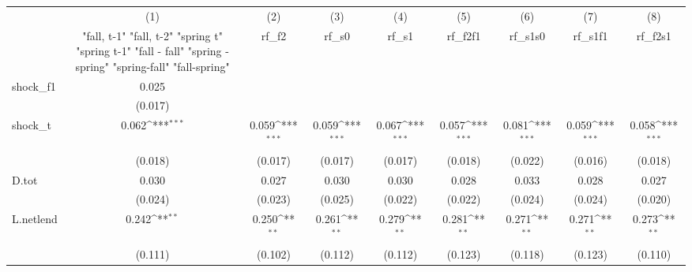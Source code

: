 {
\def\sym#1{\ifmmode^{#1}\else\(^{#1}\)\fi}
\begin{tabular}{l*{8}{c}}
\toprule
            &\multicolumn{1}{c}{(1)}&\multicolumn{1}{c}{(2)}&\multicolumn{1}{c}{(3)}&\multicolumn{1}{c}{(4)}&\multicolumn{1}{c}{(5)}&\multicolumn{1}{c}{(6)}&\multicolumn{1}{c}{(7)}&\multicolumn{1}{c}{(8)}\\
            &\multicolumn{1}{c}{  "fall, t-1" "fall, t-2" "spring t" "spring t-1"  "fall - fall" "spring - spring" "spring-fall" "fall-spring" }&\multicolumn{1}{c}{rf\_f2}&\multicolumn{1}{c}{rf\_s0}&\multicolumn{1}{c}{rf\_s1}&\multicolumn{1}{c}{rf\_f2f1}&\multicolumn{1}{c}{rf\_s1s0}&\multicolumn{1}{c}{rf\_s1f1}&\multicolumn{1}{c}{rf\_f2s1}\\
\midrule
shock\_f1    &       0.025         &                     &                     &                     &                     &                     &                     &                     \\
            &     (0.017)         &                     &                     &                     &                     &                     &                     &                     \\
\addlinespace
shock\_t     &       0.062\sym{***}&       0.059\sym{***}&       0.059\sym{***}&       0.067\sym{***}&       0.057\sym{***}&       0.081\sym{***}&       0.059\sym{***}&       0.058\sym{***}\\
            &     (0.018)         &     (0.017)         &     (0.017)         &     (0.017)         &     (0.018)         &     (0.022)         &     (0.016)         &     (0.018)         \\
\addlinespace
D.tot       &       0.030         &       0.027         &       0.030         &       0.030         &       0.028         &       0.033         &       0.028         &       0.027         \\
            &     (0.024)         &     (0.023)         &     (0.025)         &     (0.022)         &     (0.022)         &     (0.024)         &     (0.024)         &     (0.020)         \\
\addlinespace
L.netlend   &       0.242\sym{**} &       0.250\sym{**} &       0.261\sym{**} &       0.279\sym{**} &       0.281\sym{**} &       0.271\sym{**} &       0.271\sym{**} &       0.273\sym{**} \\
            &     (0.111)         &     (0.102)         &     (0.112)         &     (0.112)         &     (0.123)         &     (0.118)         &     (0.123)         &     (0.110)         \\

\end{tabular}}
